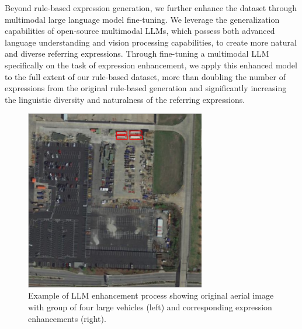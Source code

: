 Beyond rule-based expression generation, we further enhance the dataset through multimodal large language model fine-tuning. We leverage the generalization capabilities of open-source multimodal LLMs, which possess both advanced language understanding and vision processing capabilities, to create more natural and diverse referring expressions. Through fine-tuning a multimodal LLM specifically on the task of expression enhancement, we apply this enhanced model to the full extent of our rule-based dataset, more than doubling the number of expressions from the original rule-based generation and significantly increasing the linguistic diversity and naturalness of the referring expressions.

\begin{figure}[H]
\centering
\begin{minipage}{0.5\textwidth}
\centering
\includegraphics[width=0.7\textwidth]{./Images/example_group.png}
\end{minipage}%
\begin{minipage}{0.5\textwidth}
\centering
\hspace{-1cm}
\end{minipage}
\caption{Example of LLM enhancement process showing original aerial image with group of four large vehicles (left) and corresponding expression enhancements (right).}
\label{fig:llm_enhancement_example}
\end{figure}

